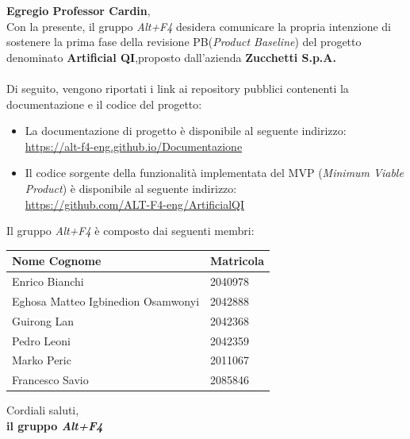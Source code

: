 \documentclass[a4paper, 12pt]{article}
\begin{document}
\primapagina

\newpage

\noindent
\textbf{Egregio Professor Cardin}, \\
Con la presente, il gruppo \textit{Alt+F4} desidera comunicare la propria intenzione di sostenere la prima fase della revisione PB(\textit{Product Baseline}) del progetto denominato \textbf{Artificial QI},proposto dall'azienda  \textbf{Zucchetti S.p.A.}\\
\\
Di seguito, vengono riportati i link ai repository pubblici contenenti la documentazione e il codice del progetto:
\begin{itemize}

\item La documentazione di progetto è disponibile al seguente indirizzo: \\ 
\href{https://alt-f4-eng.github.io/Documentazione}{https://alt-f4-eng.github.io/Documentazione}\\


\item Il codice sorgente della funzionalità implementata del MVP (\textit{Minimum Viable Product}) è disponibile al seguente indirizzo:\\
\href{https://github.com/ALT-F4-eng/ArtificialQI}{https://github.com/ALT-F4-eng/ArtificialQI}

\end{itemize}

\noindent
Il gruppo \textit{Alt+F4} è composto dai seguenti membri:
\begin{table}[H]
    \centering
    \begin{tabular}{| l | l |}
    \hline
    \textbf{Nome Cognome} & 
    \textbf{Matricola}\\ 
        \hline
            Enrico Bianchi&
            2040978 \\
        \hline 
            Eghosa Matteo Igbinedion Osamwonyi&
            2042888 \\
        \hline 
            Guirong Lan&
            2042368 \\
        \hline 
            Pedro Leoni&
            2042359 \\
        \hline 
            Marko Peric&
            2011067 \\
        \hline 
            Francesco Savio&
            2085846 \\
        \hline 
    \end{tabular}
\end{table}
\noindent
Cordiali saluti,\\
\textbf{il gruppo \textit{Alt+F4}}
\end{document}
